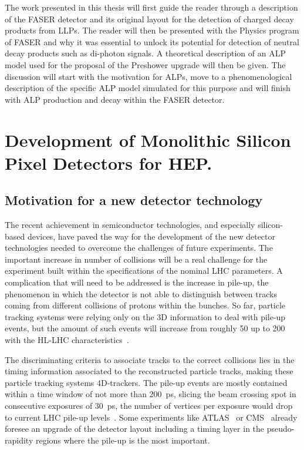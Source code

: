 The work presented in this thesis will first guide the reader through a description of the FASER detector and its original layout for the detection of charged decay products from LLPs. The reader will then be presented with the Physics program of FASER and why it was essential to unlock its potential for detection of neutral decay products such as di-photon signals. A theoretical description of an ALP model used for the proposal of the Preshower upgrade will then be given. The discussion will start with the motivation for ALPs, move to a phenomenological description of the specific ALP model simulated for this purpose and will finish with ALP production and decay within the FASER detector. 

\section{Development of Monolithic Silicon Pixel Detectors for HEP.}
\subsection{Motivation for a new detector technology}
The recent achievement in semiconductor technologies, and especially silicon-based devices, have paved the way for the development of the new detector technologies needed to overcome the challenges of future experiments. The important increase in number of collisions will be a real challenge for the experiment built within the specifications of the nominal LHC parameters. A complication that will need to be addressed is the increase in pile-up, the phenomenon in which the detector is not able to distinguish between tracks coming from different collisions of protons within the bunches. So far, particle tracking systems were relying only on the 3D information to deal with pile-up events, but the amount of such events will increase from roughly 50 up to 200 with the HL-LHC characteristics\ \cite{PhaseII_Atlas}.

The discriminating criteria to associate tracks to the correct collisions lies in the timing information associated to the reconstructed particle tracks, making these particle tracking systems 4D-trackers. The pile-up events are mostly contained within a time window of not more than \SI{200}{\pico\second}, slicing the beam crossing spot in consecutive exposures of \SI{30}{\pico\second}, the number of vertices per exposure would drop to current LHC pile-up levels\ \cite{PhaseII_CMS}. Some experiments like ATLAS\ \cite{PhaseII_Atlas} or CMS\ \cite{PhaseII_CMS} already foresee an upgrade of the detector layout including a timing layer in the pseudo-rapidity regions where the pile-up is the most important. \\

